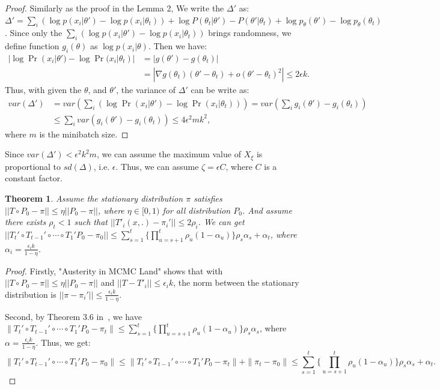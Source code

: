 \documentclass{article}
\newtheorem{theorem}{Theorem}
\begin{document}
\begin{proof}
Similarly as the proof in the Lemma 2, We write the $\Delta'$ as: $\Delta' = \sum_i (\log
p(x_i|\theta') - \log p(x_i|\theta_t)) + \log P(\theta_t | \theta') - P(\theta'|\theta_t) + \log
p_{\theta}(\theta') - \log p_{\theta}(\theta_t)$. Since only the $\sum_i (\log p(x_i|\theta') - \log
p(x_i|\theta_t))$ brings randomness, we define function $g_i(\theta)$ as $\log p(x_i|\theta)$. Then
we have:
\begin{align*} 
|\log \Pr(x_i | \theta') - \log \Pr (x_i |\theta_t)| & = |g(\theta') - g(\theta_t)| \\
&= |\nabla g(\theta_t) (\theta' - \theta_t) + o(\theta' - \theta_t)^2| \leq 2\epsilon k.
\end{align*}
Thus, with given the $\theta$, and $\theta'$, the variance of $\Delta'$ can be write as:
\begin{align*}
var(\Delta') &= var(\sum_i (\log \Pr(x_i | \theta') - \log \Pr (x_i |\theta_t))) = var(\sum_i g_i(\theta') - g_i(\theta_t)) \\
& \leq \sum_i var(g_i(\theta') - g_i(\theta_t)) \leq  4\epsilon^2 m k^2,
\end{align*}
where $m$ is the minibatch size.
\end{proof}

Since $var(\Delta') < \epsilon^2 k^2 m$, we can assume the maximum value of $X_{\xi}$ is
proportional to $sd(\Delta)$, i.e. $\epsilon$. Thus, we can assume $\zeta=\epsilon C$, where $C$ is
a constant factor.

\begin{theorem}
Assume the stationary distribution $\pi$ satisfies $||T \circ P_0 - \pi|| \leq \eta ||P_0 - \pi||$,
where $\eta \in [0, 1)$ for all distribution $P_0$. And assume there exists $\rho_t < 1$ such that
$||T'_i(x, .) - \pi_i'|| \leq 2\rho_i$. We can get $|| T_t' \circ T_{t-1}' \circ \cdots \circ T_1' P_0
- \pi_0 || \leq \sum_{s=1}^t \{\prod _{u=s+1}^t \rho_u (1-\alpha_u)\} \rho_s \alpha_s + \alpha_t $,
where $\alpha_i = \frac{\epsilon_i k }{1-\eta}$.
\end{theorem}

\begin{proof}
Firstly, "Austerity in MCMC Land" shows that with $||T \circ P_0 - \pi|| \leq \eta ||P_0 - \pi||$
and $||T-T'_i|| \leq \epsilon_i k$, the norm between the stationary distribution is $||\pi -
\pi_i'||\leq \frac{\epsilon_i k}{1-\eta}$.

Second, by Theorem 3.6 in~\cite{yang2013sequential}, we have  $\| T_t' \circ T_{t-1}' \circ \cdots
\circ T_1' P_0 - \pi_t \| \leq \sum_{s=1}^t \{\prod _{u=s+1}^t \rho_u (1-\alpha_u)\} \rho_s
\alpha_s$, where $\alpha = \frac{\epsilon_i k}{1-\eta}$. Thus, we get:
\[
 \| T_t' \circ T_{t-1}' \circ \cdots \circ T_1' P_0 - \pi_0 \| \leq \|T_t' \circ T_{t-1}' \circ
 \cdots \circ T_1' P_0 - \pi_t\| + \|\pi_t - \pi_0\| \leq \sum_{s=1}^t \{\prod _{u=s+1}^t \rho_u
 (1-\alpha_u)\} \rho_s \alpha_s + \alpha_t.
\]
\end{proof}
\end{document}
